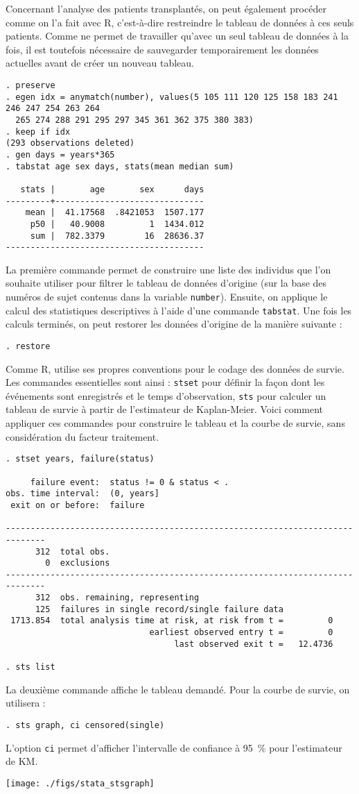Concernant l'analyse des patients transplantés, on peut également procéder
comme on l'a fait avec R, c'est-à-dire restreindre le tableau de données à
ces seuls patients. Comme \Stata ne permet de travailler qu'avec un seul
tableau de données à la fois, il est toutefois nécessaire de sauvegarder
temporairement les données actuelles avant de créer un nouveau tableau.
\begin{verbatim}
. preserve
. egen idx = anymatch(number), values(5 105 111 120 125 158 183 241 246 247 254 263 264
  265 274 288 291 295 297 345 361 362 375 380 383)
. keep if idx
(293 observations deleted)
. gen days = years*365
. tabstat age sex days, stats(mean median sum)

   stats |       age       sex      days
---------+------------------------------
    mean |  41.17568  .8421053  1507.177
     p50 |   40.9008         1  1434.012
     sum |  782.3379        16  28636.37
----------------------------------------
\end{verbatim}
La première commande permet de construire une liste des individus que l'on
souhaite utiliser pour filtrer le tableau de données d'origine (sur la base
des numéros de sujet contenus dans la variable \texttt{number}). Ensuite, on
applique le calcul des statistiques descriptives à l'aide d'une commande
\texttt{tabstat}. Une fois les calculs terminés, on peut restorer les
données d'origine de la manière suivante :
\begin{verbatim}
. restore
\end{verbatim}

Comme R, \Stata utilise ses propres conventions pour le codage des données de
survie. Les commandes essentielles sont ainsi : \texttt{stset} pour définir
la façon dont les événements sont enregistrés et le temps d'observation,
\texttt{sts} pour calculer un tableau de survie à partir de l'estimateur de
Kaplan-Meier. Voici comment appliquer ces commandes pour construire le
tableau et la courbe de survie, sans considération du facteur traitement.
\begin{verbatim}
. stset years, failure(status)

     failure event:  status != 0 & status < .
obs. time interval:  (0, years]
 exit on or before:  failure

------------------------------------------------------------------------------
      312  total obs.
        0  exclusions
------------------------------------------------------------------------------
      312  obs. remaining, representing
      125  failures in single record/single failure data
 1713.854  total analysis time at risk, at risk from t =         0
                             earliest observed entry t =         0
                                  last observed exit t =   12.4736

. sts list
\end{verbatim}
La deuxième commande affiche le tableau demandé. Pour la courbe de survie,
on utilisera :
\begin{verbatim}
. sts graph, ci censored(single)
\end{verbatim}
L'option \texttt{ci} permet d'afficher l'intervalle de confiance à 95~\%
pour l'estimateur de KM.

\texttt{[image: ./figs/stata\_stsgraph]}
